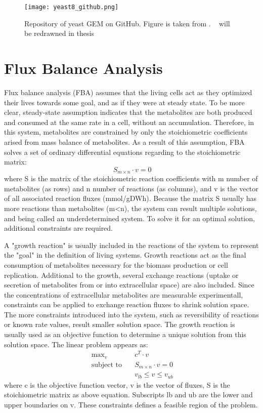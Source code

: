 \begin{figure}[H]
\begin{center}
\texttt{[image: yeast8\_github.png]}
\end{center}
\caption[Repository of yeast GEM on GitHub]{Repository of yeast GEM on GitHub. Figure is taken from \cite{lu2019consensus}. ~ will be redrawned in thesis}
\label{fig:yeast8_github}
\end{figure}

\section{Flux Balance Analysis}
Flux balance analysis (FBA) assumes that the living cells act as they optimized their lives towards some goal, and as if they were at steady state. To be more clear, steady-state assumption indicates that the metabolites are both produced and consumed at the same rate in a cell, without an accumulation. Therefore, in this system, metabolites are constrained by only the stoichiometric coefficients arised from mass balance of metabolites. As a result of this assumption, FBA solves a set of ordinary differential equations regarding to the stoichiometric matrix:
\begin{equation}
 \ S_{m \times n} \cdot v=0
\end{equation}
\noindent where S is the matrix of the stoichiometric reaction coefficients with m number of metabolites (as rows) and n number of reactions (as columns), and v is the vector of all associated reaction fluxes (mmol/gDWh). Because the matrix S usually has more reactions than metabolites (m<n), the system can result multiple solutions, and being called an underdetermined system. To solve it for an optimal solution, additional constraints are required.

A "growth reaction" is usually included in the reactions of the system to represent the "goal" in the definition of living systems. Growth reactions act as the final consumption of metabolites necessary for the biomass production or cell replication. Additional to the growth, several exchange reactions (uptake or secretion of metabolites from or into extracellular space) are also included. Since the concentrations of extracellular metabolites are measurable experimentall, constraints can be applied to exchange reaction fluxes to shrink solution space. The more constraints introduced into the system, such as reversibility of reactions or known rate values, result smaller solution space. The growth reaction is usually used as an objective function to determine a unique solution from this solution space. The linear problem appears as:
\begin{align}
 \ \text{max}_v \quad & c^T \cdot v \\
 \label{eq:fba}
 \ \text{subject to} \quad & S_{m \times n} \cdot v=0 \\
 \ & v_{lb} \leq v \leq v_{ub}
\end{align}
\noindent where c is the objective function vector, v is the vector of fluxes, S is the stoichiometric matrix as above equation. Subscripts lb and ub are the lower and upper boundaries on v. These constraints defines a feasible region of the problem.

